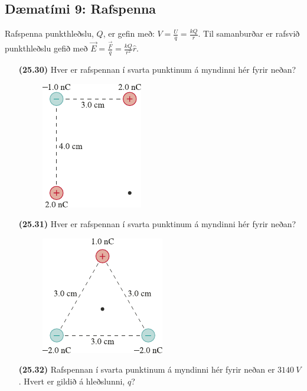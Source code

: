\ifdefined \wholebook \else\documentclass[oneside]{book}\usepackage{EdlBook}\graphicspath{{figures/}}
\begin{document}
\newpage

\subsection*{Dæmatími 9: Rafspenna}

\begin{tcolorbox}
Rafspenna punkthleðslu, $Q$, er gefin með: $V = \frac{U}{q} = \frac{kQ}{r}$. Til samanburðar er rafsvið punkthleðslu gefið með $\vec{E} = \frac{\vec{F}}{q} = \frac{kQ}{r^2}\hat{r}$.
\end{tcolorbox}

\begin{enumerate}[label = \textbf{(\alph*)}]

\item[\textbf{(25.30)}] Hver er rafspennan í svarta punktinum á myndinni hér fyrir neðan?

\begin{figure}[H]
    \centering
    \includegraphics{figures/rk2530.pdf}
\end{figure}

\item[\textbf{(25.31)}] Hver er rafspennan í svarta punktinum á myndinni hér fyrir neðan?

\begin{figure}[H]
    \centering
    \includegraphics{figures/rk2531.pdf}
\end{figure}

\item[\textbf{(25.32)}] Rafspennan í svarta punktinum á myndinni hér fyrir neðan er $\SI{3140}{V}$. Hvert er gildið á hleðslunni, $q$?


\end{enumerate}
\end{document}
